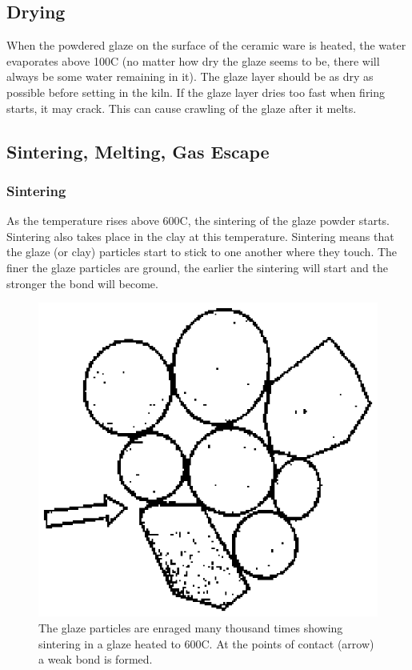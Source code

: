 \subsection{Drying}
When the powdered glaze on the surface of the ceramic ware is heated, the water 
evaporates above 100\degree C (no matter how dry the glaze seems to be, there 
will 
always be some water remaining in it). The glaze layer should be as dry as 
possible before setting in the kiln. If the glaze layer dries too fast when 
firing starts, it may crack. This can cause crawling of the glaze after it 
melts.
\subsection{Sintering, Melting, Gas Escape}
\subsubsection{Sintering}
As the temperature rises above 600\degree C, the sintering of the glaze powder 
starts. 
Sintering also takes place in the clay at this temperature. Sintering means 
that the glaze (or clay) particles start to stick to one another where they 
touch. The finer the glaze particles are ground, the earlier the sintering will 
start and the stronger the bond will become.
\begin{figure}[htbp!]
  \centering
  \includegraphics[width=0.5\linewidth]{img/sintering.eps}
  \caption{The glaze particles are enraged many thousand times showing 
  sintering in a glaze heated to 600\degree C. At the points of contact (arrow) 
  a weak 
  bond is formed.}
  \label{fig:sintering}
\end{figure}
